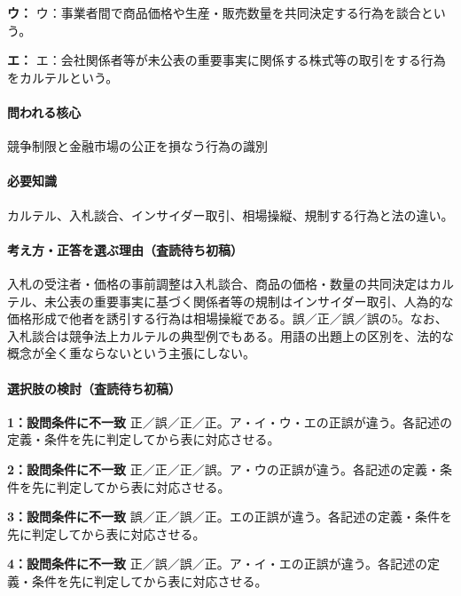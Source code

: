 \noindent\textbf{ウ：} ウ：事業者間で商品価格や生産・販売数量を共同決定する行為を談合という。\par

\noindent\textbf{エ：} エ：会社関係者等が未公表の重要事実に関係する株式等の取引をする行為をカルテルという。\par

\paragraph{問われる核心} 競争制限と金融市場の公正を損なう行為の識別

\paragraph{必要知識} カルテル、入札談合、インサイダー取引、相場操縦、規制する行為と法の違い。

\paragraph{考え方・正答を選ぶ理由（査読待ち初稿）} 入札の受注者・価格の事前調整は入札談合、商品の価格・数量の共同決定はカルテル、未公表の重要事実に基づく関係者等の規制はインサイダー取引、人為的な価格形成で他者を誘引する行為は相場操縦である。誤／正／誤／誤の5。なお、入札談合は競争法上カルテルの典型例でもある。用語の出題上の区別を、法的な概念が全く重ならないという主張にしない。

\paragraph{選択肢の検討（査読待ち初稿）}\mbox{}\par

\noindent\textbf{1：設問条件に不一致} 正／誤／正／正。ア・イ・ウ・エの正誤が違う。各記述の定義・条件を先に判定してから表に対応させる。\par

\noindent\textbf{2：設問条件に不一致} 正／正／正／誤。ア・ウの正誤が違う。各記述の定義・条件を先に判定してから表に対応させる。\par

\noindent\textbf{3：設問条件に不一致} 誤／正／誤／正。エの正誤が違う。各記述の定義・条件を先に判定してから表に対応させる。\par

\noindent\textbf{4：設問条件に不一致} 正／誤／誤／正。ア・イ・エの正誤が違う。各記述の定義・条件を先に判定してから表に対応させる。\par

